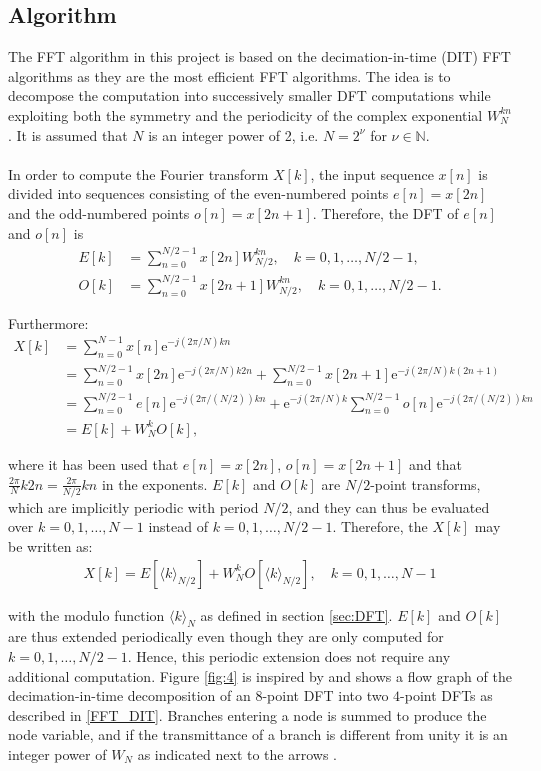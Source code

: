 \subsection{Algorithm}
The FFT algorithm in this project is based on the decimation-in-time (DIT) FFT algorithms as they are the most efficient FFT algorithms. The idea is to decompose the computation into successively smaller DFT computations while exploiting both the symmetry and the periodicity of the complex exponential $W_N^{kn}$ \cite{page 755, DTSP}. It is assumed that $N$ is an integer power of 2, i.e. $N = 2^\nu$ for $\nu \in \mathbb{N}$.
\\ \\
In order to compute the Fourier transform $X[k]$, the input sequence $x[n]$ is divided into sequences consisting of the even-numbered points $e[n] = x[2n]$ and the odd-numbered points $o[n] = x[2n+1]$. Therefore, the DFT of $e[n]$ and $o[n]$ is
\begin{align*}
E[k] &= \sum_{n=0}^{N/2-1} x[2n] W_{N/2}^{kn}, \quad k = 0, 1, \dots, N/2-1, \\
O[k] &= \sum_{n=0}^{N/2-1} x[2n+1] W_{N/2}^{kn}, \quad k = 0, 1, \dots, N/2-1.
\end{align*}

Furthermore:
\begin{align}
X[k] &= \sum_{n=0}^{N-1} x[n] \text{e}^{-j(2\pi/N)kn} \nonumber \\
&= \sum_{n=0}^{N/2-1} x[2n] \text{e}^{-j(2\pi/N)k2n} + \sum_{n=0}^{N/2-1} x[2n+1] \text{e}^{-j(2\pi/N)k(2n+1)} \nonumber \\
&= \sum_{n=0}^{N/2-1} e[n] \text{e}^{-j(2\pi/(N/2))kn} + \text{e}^{-j(2\pi/N)k} \sum_{n=0}^{N/2-1} o[n] \text{e}^{-j(2\pi/(N/2))kn} \nonumber \\
&= E[k] + W_N^k O[k], \label{FFT_DIT}
\end{align}

where it has been used that $e[n] = x[2n]$, $o[n] = x[2n+1]$ and that $\frac{2\pi}{N} k2n = \frac{2\pi}{N/2} kn$ in the exponents. $E[k]$ and $O[k]$ are $N/2$-point transforms, which are implicitly periodic with period $N/2$, and they can thus be evaluated over $k = 0, 1, \dots, N-1$ instead of $k = 0, 1, \dots, N/2-1$. Therefore, the $X[k]$ may be written as:
\begin{align} \label{FFT_modulo}
X[k] = E[\langle k\rangle_{N/2}] + W_N^k O[\langle k\rangle_{N/2}], \quad k = 0, 1, \dots, N-1
\end{align}

with the modulo function $\langle k \rangle_N$ as defined in section \ref{sec:DFT}. $E[k]$ and $O[k]$ are thus extended periodically even though they are only computed for $k = 0, 1, \dots, N/2-1$. Hence, this periodic extension does not require any additional computation. Figure \ref{fig:4} is inspired by \cite{figure 4, DTSP} and shows a flow graph of the decimation-in-time decomposition of an $8$-point DFT into two $4$-point DFTs as described in \eqref{FFT_DIT}. Branches entering a node is summed to produce the node variable, and if the transmittance of a branch is different from unity it is an integer power of $W_N$ as indicated next to the arrows .


